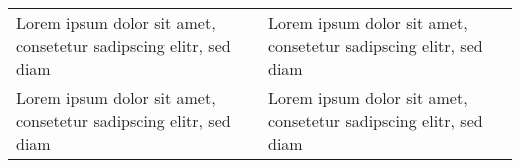 

\begin{table}[htb]

\ifthenelse{\isundefined{\tabLenA}}{\newlength{\tabLenA}}{}
\ifthenelse{\isundefined{\tabLenB}}{\newlength{\tabLenB}}{}

\setlength{\tabLenA}{0.10\textwidth}
\setlength{\tabLenB}{0.20\textwidth}

\begin{tabularx}{\textwidth}{p{\tabLenA}p{\tabLenB}}
\toprule
\toprule

Lorem ipsum dolor sit amet, consetetur sadipscing elitr, sed diam
&

Lorem ipsum dolor sit amet, consetetur sadipscing elitr, sed diam
\\

Lorem ipsum dolor sit amet, consetetur sadipscing elitr, sed diam
&

Lorem ipsum dolor sit amet, consetetur sadipscing elitr, sed diam
\\
\bottomrule
\end{tabularx}
\end{table}
